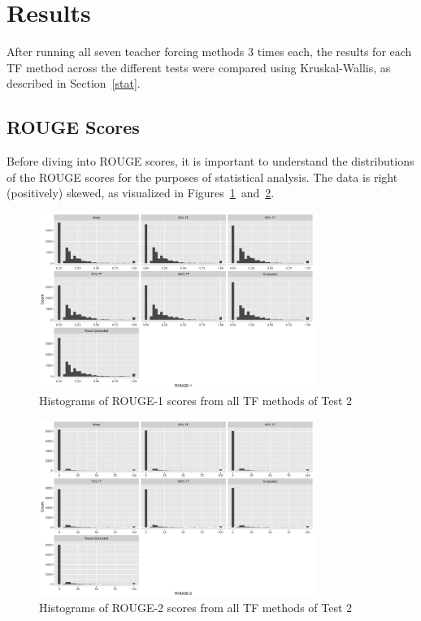 \section{Results}\label{results}
After running all seven teacher forcing methods 3 times each, the results for each TF method across the different tests were compared using Kruskal-Wallis, as described in Section~\ref{stat}. 

\subsection{ROUGE Scores}\label{results:rouge}
Before diving into ROUGE scores, it is important to understand the distributions of the ROUGE scores for the purposes of statistical analysis. The data is right (positively) skewed, as visualized in Figures~\ref{fig:r1hists}~and~\ref{fig:r2hists}.

\begin{figure}[h]
  \centering
  \includegraphics[width=0.8\textwidth]{../plots/test2/r1hists}
  \caption{Histograms of ROUGE-1 scores from all TF methods of Test 2}
  \label{fig:r1hists}
\end{figure}

\begin{figure}[h]
  \centering
  \includegraphics[width=0.8\textwidth]{../plots/test2/r2hists}
  \caption{Histograms of ROUGE-2 scores from all TF methods of Test 2}
  \label{fig:r2hists}
\end{figure}

